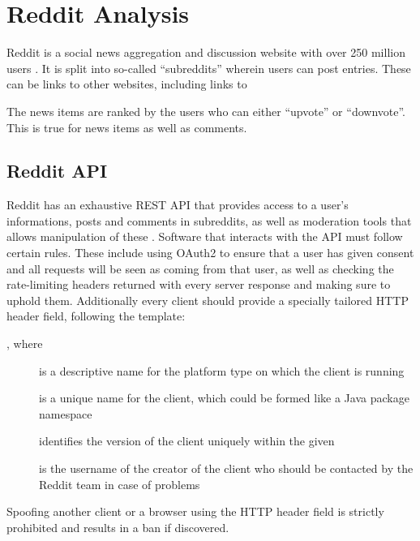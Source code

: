 \section{Reddit Analysis}\label{sec:reddit-analysis}

Reddit is a social news aggregation and discussion website with over 250 million users \citep{AdvertiseOnReddit}.
It is split into so-called ``subreddits'' wherein users can post entries.
These can be links to other websites, including links to \nl

The news items are ranked by the users who can either ``upvote'' or ``downvote''.
This is true for news items as well as comments. \citep{AboutReddit}\nl

\subsection{Reddit API}\label{subsec:reddit-api}

Reddit has an exhaustive \ac{REST} \ac{API} that provides access to a user's informations, posts and comments in
subreddits, as well as moderation tools that allows manipulation of these \citep{RedditApi}.
Software that interacts with the \ac{API} must follow certain rules.
These include using OAuth2 to ensure that a user has given consent and all requests will be seen as coming from that
user, as well as checking the rate-limiting headers returned with every server response and making sure to uphold them.
Additionally every client should provide a specially tailored  \ac{HTTP} header field, following the
template: \citep{RedditApiRules}\nl

\begin{center}
  , where
\end{center}\nl

\begin{description}
  \item[] is a descriptive name for the platform type on which the client is running
  \item[] is a unique name for the client, which could be formed like a Java package namespace
  \item[] identifies the version of the client uniquely within the given 
  \item[] is the username of the creator of the client who should be contacted by the Reddit team
  in case of problems
\end{description}\nl

Spoofing another client or a browser using the  \ac{HTTP} header field is strictly prohibited and
results in a ban if discovered. \citep{RedditApiRules}\nl
